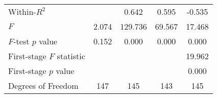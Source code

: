\begin{tabular}{lcccc}
Within-$R^2$              &          &   0.642  &   0.595   &             -0.535             \\ 
$F$                       &   2.074  &  129.736 &   69.567  &             17.468             \\ 
$F$-test $p$ value        &   0.152  &   0.000  &   0.000   &              0.000             \\ 
First-stage $F$ statistic &          &          &           &             19.962             \\ 
First-stage $p$ value     &          &          &           &              0.000             \\ 
Degrees of Freedom        &    147   &    145   &    143    &               145              \\ 
\bottomrule
\end{tabular}

